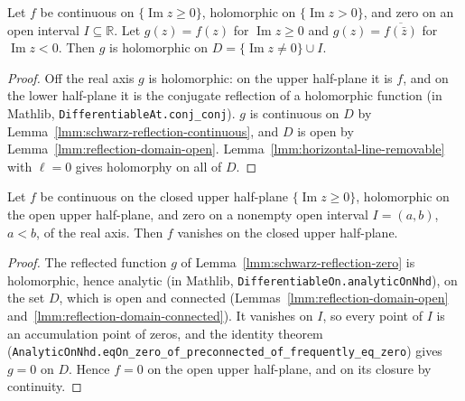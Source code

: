 \begin{lemma}
    \label{lmm:schwarz-reflection-zero}
    \leanok
    Let $f$ be continuous on $\{\operatorname{Im} z \ge 0\}$, holomorphic on $\{\operatorname{Im} z > 0\}$, and zero on an open interval $I \subseteq \mathbb{R}$. Let $g(z) = f(z)$ for $\operatorname{Im} z \ge 0$ and $g(z) = \overline{f(\bar z)}$ for $\operatorname{Im} z < 0$. Then $g$ is holomorphic on $D = \{\operatorname{Im} z \ne 0\} \cup I$.
\end{lemma}
\begin{proof}
    \leanok
    Off the real axis $g$ is holomorphic: on the upper half-plane it is $f$, and on the lower half-plane it is the conjugate reflection of a holomorphic function (in Mathlib, \texttt{DifferentiableAt.conj\_conj}). $g$ is continuous on $D$ by Lemma~\ref{lmm:schwarz-reflection-continuous}, and $D$ is open by Lemma~\ref{lmm:reflection-domain-open}. Lemma~\ref{lmm:horizontal-line-removable} with $\ell = 0$ gives holomorphy on all of $D$.
\end{proof}

\begin{lemma}
    \label{lmm:edge-vanishing}
    \leanok
    Let $f$ be continuous on the closed upper half-plane $\{\operatorname{Im} z \ge 0\}$, holomorphic on the open upper half-plane, and zero on a nonempty open interval $I = (a, b)$, $a < b$, of the real axis. Then $f$ vanishes on the closed upper half-plane.
\end{lemma}
\begin{proof}
    \leanok
    The reflected function $g$ of Lemma~\ref{lmm:schwarz-reflection-zero} is holomorphic, hence analytic (in Mathlib, \texttt{DifferentiableOn.analyticOnNhd}), on the set $D$, which is open and connected (Lemmas~\ref{lmm:reflection-domain-open} and~\ref{lmm:reflection-domain-connected}). It vanishes on $I$, so every point of $I$ is an accumulation point of zeros, and the identity theorem (\texttt{AnalyticOnNhd.eqOn\_zero\_of\_preconnected\_of\_frequently\_eq\_zero}) gives $g = 0$ on $D$. Hence $f = 0$ on the open upper half-plane, and on its closure by continuity.
\end{proof}


